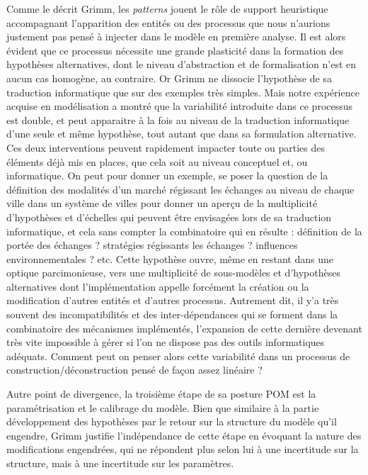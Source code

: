 Comme le décrit Grimm, les \textit{patterns} jouent le rôle de support heuristique accompagnant l'apparition des entités ou des processus que nous n'aurions justement pas pensé à injecter dans le modèle en première analyse. Il est alors évident que ce processus nécessite une grande plasticité dans la formation des hypothèses alternatives, dont le niveau d'abstraction et de formalisation n'est en aucun cas homogène, au contraire. Or Grimm ne dissocie l'hypothèse de sa traduction informatique que sur des exemples très simples. Mais notre expérience acquise en modélisation a montré que la variabilité introduite dans ce processus est double, et peut apparaitre à la fois au niveau de la traduction informatique d'une seule et même hypothèse, tout autant que dans sa formulation alternative. Ces deux interventions peuvent rapidement impacter toute ou parties des éléments déjà mis en places, que cela soit au niveau conceptuel et, ou informatique. On peut pour donner un exemple, se poser la question de la définition des modalités d'un marché régissant les échanges au niveau de chaque ville dans un système de villes pour donner un aperçu de la multiplicité d'hypothèses et d'échelles qui peuvent être envisagées lors de sa traduction informatique, et cela sans compter la combinatoire qui en résulte : définition de la portée des échanges ? stratégies régissants les échanges ? influences environnementales ? etc. Cette hypothèse ouvre, même en restant dans une optique parcimonieuse, vers une multiplicité de sous-modèles et d'hypothèses alternatives dont l'implémentation appelle forcément la création ou la modification d'autres entités et d'autres processus. Autrement dit, il y'a très souvent des incompatibilités et des inter-dépendances qui se forment dans la combinatoire des mécanismes implémentés, l'expansion de cette dernière devenant très vite impossible à gérer si l'on ne dispose pas des outils informatiques adéquats. Comment peut on penser alors cette variabilité dans un processus de construction/déconstruction pensé de façon assez linéaire ?

Autre point de divergence, la troisième étape de sa posture POM est la paramétrisation et le calibrage du modèle. Bien que similaire à la partie développement des hypothèses par le retour sur la structure du modèle qu'il engendre, Grimm justifie l'indépendance de cette étape en évoquant la nature des modifications engendrées, qui ne répondent plus selon lui à une incertitude sur la structure, mais à une incertitude sur les paramètres. %

